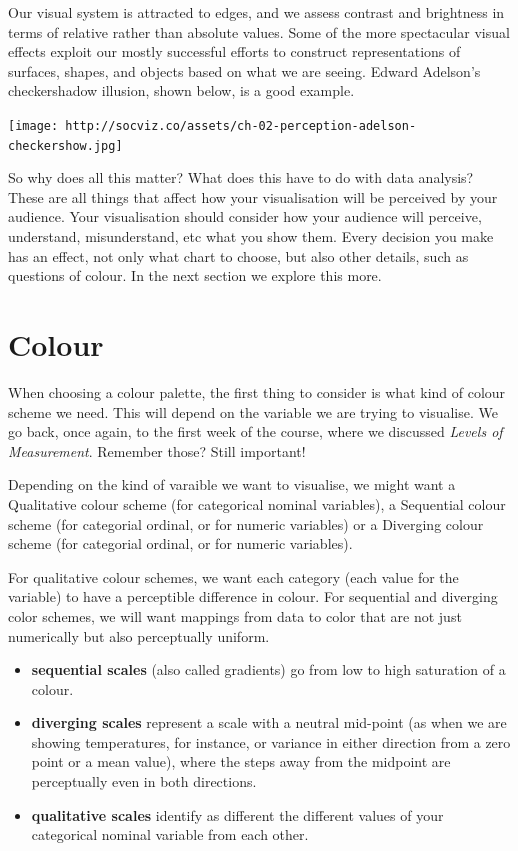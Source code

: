 \documentclass[
]{book}
\providecommand{\tightlist}{%
  \setlength{\itemsep}{0pt}\setlength{\parskip}{0pt}}
\begin{document}
Our visual system is attracted to edges, and we assess contrast and brightness in terms of relative rather than absolute values. Some of the more spectacular visual effects exploit our mostly successful efforts to construct representations of surfaces, shapes, and objects based on what we are seeing. Edward Adelson's checkershadow illusion, shown below, is a good example.

\texttt{[image: http://socviz.co/assets/ch-02-perception-adelson-checkershow.jpg]}

So why does all this matter? What does this have to do with data analysis? These are all things that affect how your visualisation will be perceived by your audience. Your visualisation should consider how your audience will perceive, understand, misunderstand, etc what you show them. Every decision you make has an effect, not only what chart to choose, but also other details, such as questions of colour. In the next section we explore this more.

\hypertarget{colour}{%
\section{Colour}\label{colour}}

When choosing a colour palette, the first thing to consider is what kind of colour scheme we need. This will depend on the variable we are trying to visualise. We go back, once again, to the first week of the course, where we discussed \emph{Levels of Measurement}. Remember those? Still important!

Depending on the kind of varaible we want to visualise, we might want a Qualitative colour scheme (for categorical nominal variables), a Sequential colour scheme (for categorial ordinal, or for numeric variables) or a Diverging colour scheme (for categorial ordinal, or for numeric variables).

For qualitative colour schemes, we want each category (each value for the variable) to have a perceptible difference in colour. For sequential and diverging color schemes, we will want mappings from data to color that are not just numerically but also perceptually uniform.

\begin{itemize}
\tightlist
\item
  \textbf{sequential scales} (also called gradients) go from low to high saturation of a colour.
\item
  \textbf{diverging scales} represent a scale with a neutral mid-point (as when we are showing temperatures, for instance, or variance in either direction from a zero point or a mean value), where the steps away from the midpoint are perceptually even in both directions.
\item
  \textbf{qualitative scales} identify as different the different values of your categorical nominal variable from each other.
\end{itemize}
\end{document}
